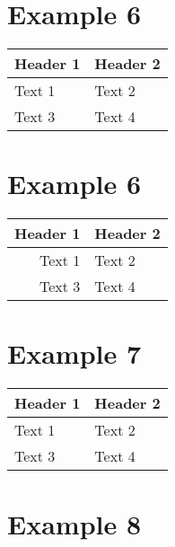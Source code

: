 \section{Example 6}\label{example-6}

\begin{longtable}[c]{@{}ll@{}}
\toprule
\textbf{Header 1} & Header 2\tabularnewline
\midrule
\endhead
Text 1\autocite{source} & Text 2\tabularnewline
Text 3 & Text 4\tabularnewline
\bottomrule
\end{longtable}

\section{Example 6}\label{example-6-1}

\begin{longtable}[c]{@{}rl@{}}
\toprule
Header 1 & Header 2\tabularnewline
\midrule
\endhead
Text 1 & Text 2\tabularnewline
Text 3 & Text 4\tabularnewline
\bottomrule
\end{longtable}

\section{Example 7}\label{example-7}

\begin{longtable}[c]{@{}ll@{}}
\toprule
\begin{minipage}[b]{0.38\columnwidth}\raggedright\strut
Header 1
\strut\end{minipage} &
\begin{minipage}[b]{0.56\columnwidth}\raggedright\strut
Header 2
\strut\end{minipage}\tabularnewline
\midrule
\endhead
\begin{minipage}[t]{0.38\columnwidth}\raggedright\strut
Text 1
\strut\end{minipage} &
\begin{minipage}[t]{0.56\columnwidth}\raggedright\strut
Text 2
\strut\end{minipage}\tabularnewline
\begin{minipage}[t]{0.38\columnwidth}\raggedright\strut
Text 3
\strut\end{minipage} &
\begin{minipage}[t]{0.56\columnwidth}\raggedright\strut
Text 4
\strut\end{minipage}\tabularnewline
\bottomrule
\end{longtable}

\section{Example 8}\label{example-8}

